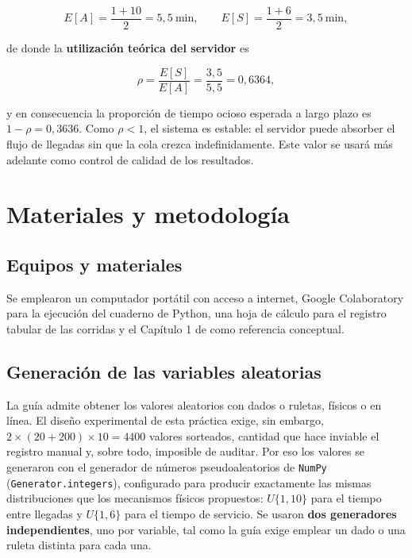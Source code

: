 \documentclass[11pt,letterpaper]{article}
\begin{document}
\[
E[A] = \frac{1+10}{2} = 5{,}5 \ \text{min}, \qquad E[S] = \frac{1+6}{2} = 3{,}5 \ \text{min},
\]

de donde la \textbf{utilización teórica del servidor} es

\begin{equation}
\rho = \frac{E[S]}{E[A]} = \frac{3{,}5}{5{,}5} = 0{,}6364,
\label{eq:rho}
\end{equation}

y en consecuencia la proporción de tiempo ocioso esperada a largo plazo es $1-\rho = 0{,}3636$. Como $\rho < 1$, el sistema es estable: el servidor puede absorber el flujo de llegadas sin que la cola crezca indefinidamente. Este valor se usará más adelante como control de calidad de los resultados.

\section{Materiales y metodología}

\subsection{Equipos y materiales}

Se emplearon un computador portátil con acceso a internet, Google Colaboratory para la ejecución del cuaderno de Python, una hoja de cálculo para el registro tabular de las corridas y el Capítulo 1 de \cite{Banks1998} como referencia conceptual.

\subsection{Generación de las variables aleatorias}
\label{sec:generacion}

La guía admite obtener los valores aleatorios con dados o ruletas, físicos o en línea. El diseño experimental de esta práctica exige, sin embargo, $2\times(20+200)\times10 = 4400$ valores sorteados, cantidad que hace inviable el registro manual y, sobre todo, imposible de auditar. Por eso los valores se generaron con el generador de números pseudoaleatorios de \texttt{NumPy} (\texttt{Generator.integers}), configurado para producir exactamente las mismas distribuciones que los mecanismos físicos propuestos: $U\{1,10\}$ para el tiempo entre llegadas y $U\{1,6\}$ para el tiempo de servicio. Se usaron \textbf{dos generadores independientes}, uno por variable, tal como la guía exige emplear un dado o una ruleta distinta para cada una.
\end{document}
